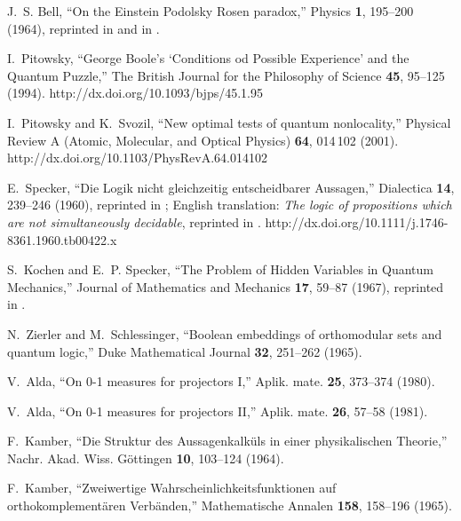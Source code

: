 \documentclass[pra,amsfonts,showpacs,showkeys,preprint]{revtex4}
\begin{document}
\begin{thebibliography}{10}
J.~S. Bell, \enquote{On the {E}instein {P}odolsky {R}osen paradox,} Physics
  {\bf 1}, 195--200 (1964), reprinted in \cite[pp. 403-408]{wheeler-Zurek:83}
  and in \cite[pp. 14-21]{bell-87}.

I.~Pitowsky, \enquote{{G}eorge {B}oole's `Conditions od Possible Experience'
  and the Quantum Puzzle,} The British Journal for the Philosophy of Science
  {\bf 45}, 95--125 (1994).
\newline http://dx.doi.org/10.1093/bjps/45.1.95

I.~Pitowsky and K.~Svozil, \enquote{New optimal tests of quantum nonlocality,}
  Physical Review A (Atomic, Molecular, and Optical Physics) {\bf 64}, 014\,102
  (2001).
\newline http://dx.doi.org/10.1103/PhysRevA.64.014102

E.~Specker, \enquote{{D}ie {L}ogik nicht gleichzeitig entscheidbarer
  {A}ussagen,} Dialectica {\bf 14}, 239--246 (1960), reprinted in \cite[pp.
  175--182]{specker-ges}; {E}nglish translation: {\it The logic of propositions
  which are not simultaneously decidable}, reprinted in \cite[pp.
  135-140]{hooker}.
\newline http://dx.doi.org/10.1111/j.1746-8361.1960.tb00422.x

S.~Kochen and E.~P. Specker, \enquote{The Problem of Hidden Variables in
  Quantum Mechanics,} Journal of Mathematics and Mechanics {\bf 17}, 59--87
  (1967), reprinted in \cite[pp. 235--263]{specker-ges}.

N.~Zierler and M.~Schlessinger, \enquote{Boolean embeddings of orthomodular
  sets and quantum logic,} Duke Mathematical Journal {\bf 32}, 251--262 (1965).

V.~Alda, \enquote{On\/ {\rm 0-1} measures for projectors I,} Aplik. mate. {\bf
  25}, 373--374 (1980).

V.~Alda, \enquote{On\/ {\rm 0-1} measures for projectors II,} Aplik. mate. {\bf
  26}, 57--58 (1981).

F.~Kamber, \enquote{Die {S}truktur des {A}ussagenkalk{\"{u}}ls in einer
  physikalischen {T}heorie,} Nachr. Akad. Wiss. G{\"{o}}ttingen {\bf 10},
  103--124 (1964).

F.~Kamber, \enquote{Zweiwertige {W}ahrscheinlichkeitsfunktionen auf
  orthokomplement{\"{a}}ren {V}erb{\"{a}}nden,} Mathematische Annalen {\bf
  158}, 158--196 (1965).


\end{thebibliography}
\end{document}

